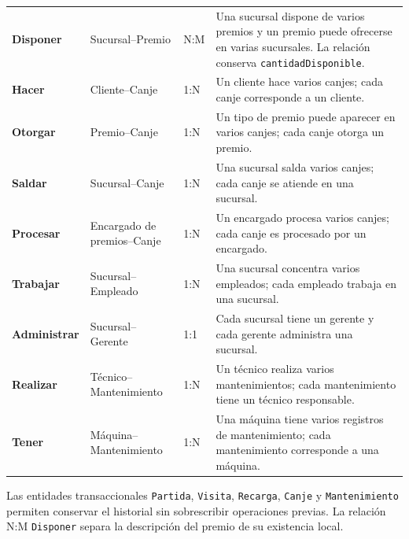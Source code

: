 \begin{center}
\begin{tabularx}{\textwidth}{@{}>{\bfseries\color{unamblue}}p{}p{}p{}X@{}}
Disponer & Sucursal--Premio & N:M & Una sucursal dispone de varios premios y
un premio puede ofrecerse en varias sucursales. La relación conserva
\texttt{cantidadDisponible}. \\
Hacer & Cliente--Canje & 1:N & Un cliente hace varios canjes; cada canje
corresponde a un cliente. \\
Otorgar & Premio--Canje & 1:N & Un tipo de premio puede aparecer en varios
canjes; cada canje otorga un premio. \\
Saldar & Sucursal--Canje & 1:N & Una sucursal salda varios canjes; cada canje
se atiende en una sucursal. \\
Procesar & Encargado de premios--Canje & 1:N & Un encargado procesa varios
canjes; cada canje es procesado por un encargado. \\
Trabajar & Sucursal--Empleado & 1:N & Una sucursal concentra varios empleados;
cada empleado trabaja en una sucursal. \\
Administrar & Sucursal--Gerente & 1:1 & Cada sucursal tiene un gerente y cada
gerente administra una sucursal. \\
Realizar & Técnico--Mantenimiento & 1:N & Un técnico realiza varios
mantenimientos; cada mantenimiento tiene un técnico responsable. \\
Tener & Máquina--Mantenimiento & 1:N & Una máquina tiene varios registros de
mantenimiento; cada mantenimiento corresponde a una máquina. \\
\bottomrule
\end{tabularx}
\end{center}

Las entidades transaccionales \texttt{Partida}, \texttt{Visita},
\texttt{Recarga}, \texttt{Canje} y \texttt{Mantenimiento} permiten conservar
el historial sin sobrescribir operaciones previas. La relación N:M
\texttt{Disponer} separa la descripción del premio de su existencia local.
